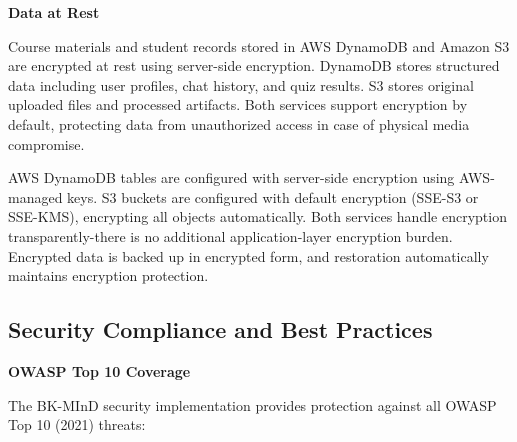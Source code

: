 \textbf{Data at Rest}

Course materials and student records stored in AWS DynamoDB and Amazon S3 are encrypted at rest using server-side encryption. DynamoDB stores structured data including user profiles, chat history, and quiz results. S3 stores original uploaded files and processed artifacts. Both services support encryption by default, protecting data from unauthorized access in case of physical media compromise.

AWS DynamoDB tables are configured with server-side encryption using AWS-managed keys. S3 buckets are configured with default encryption (SSE-S3 or SSE-KMS), encrypting all objects automatically. Both services handle encryption transparently-there is no additional application-layer encryption burden. Encrypted data is backed up in encrypted form, and restoration automatically maintains encryption protection.



\subsection{Security Compliance and Best Practices}

\textbf{OWASP Top 10 Coverage}

The BK-MInD security implementation provides protection against all OWASP Top 10 (2021) threats:

